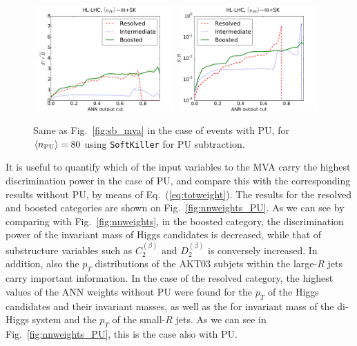 \begin{figure}[t]
\begin{center}
\includegraphics[width=0.48\textwidth]{plots/ssb_SKPU80.pdf}
\includegraphics[width=0.48\textwidth]{plots/sb_SKPU80.pdf}
\caption{\small 
Same as Fig.~\ref{fig:sb_mva} in the
case of events with PU, for
$\left\langle n_{\rm PU}\right\rangle=80$
using
{\tt SoftKiller} for PU subtraction.
}
\label{fig:sb_mva_PU}
\end{center}
\end{figure}

It is useful to quantify which of the input variables
to the MVA carry the highest discrimination power
in the case of PU,
and compare this with the corresponding
results without PU, by means of
Eq.~(\ref{eq:totweight}).
%
The 
results for the resolved and boosted categories are shown
on Fig.~\ref{fig:nnweights_PU}.
%
As we can see by comparing with Fig.~\ref{fig:nnweights}, 
in the boosted category, the discrimination power of the invariant
mass of Higgs candidates is decreased, while
that of  substructure
variables such as $C_2^{(\beta)}$ and
$D^{(\beta)}_2$ is conversely
increased.
%
In addition, also the $p_T$ distributions of the AKT03
subjets within the large-$R$
jets carry important information.
%
In the case of the resolved category,  the highest
values of the ANN weights without PU
were found for the $p_T$ of the 
Higgs candidates and their invariant masses, as well
as the for invariant mass of the di-Higgs system
and the $p_T$ of the small-$R$ jets.
%
As we can see in Fig.~\ref{fig:nnweights_PU},
this is the case also with PU.


